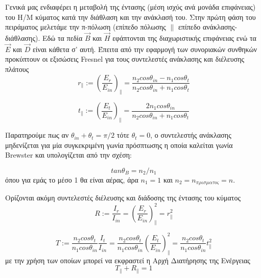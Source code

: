 \documentclass[a4paper]{article}
\begin{document}
Γενικά μας ενδιαφέρει η μεταβολή της έντασης (μέση ισχύς ανά μονάδα επιφάνειας) του Η/Μ κύματος κατά την διάθλαση και την ανάκλασή του. Στην πρώτη φάση του πειράματος μελετάμε την π-πόλωση (επίπεδο πόλωσης $\parallel$ επίπεδο ανάκλασης-διάθλασης). \footnotemark
{}
 Εδώ τα πεδία $\vec{B}$ και $\vec{H}$ εφάπτονται της διαχωριστικής επιφάνειας ενώ τα $\vec{E}$ και $\vec{D}$ είναι κάθετα σ' αυτή. Έπειτα από την εφαρμογή των συνοριακών συνθηκών προκύπτουν οι εξισώσεις Fresnel για τους συντελεστές ανάκλασης και διέλευσης πλάτους
\begin{equation}\label{1}
 r_{\parallel} := \left( \frac{E_r}{E_{in}} \right)_{\parallel} = \frac{n_2cos\theta_{in}-n_1cos			              \theta_t}{n_2cos\theta_{in}+n_1cos\theta_t}     
 \end{equation}
 
 \begin{equation}\label{2}
	t_{\parallel} := \left( \frac{E_t}{E_{in}} \right)_{\parallel} = \frac{2n_1cos\theta_{in}}{n_2cos\theta_{in}+n_1cos\theta_t}
\end{equation}
	
Παρατηρούμε πως αν $\theta_{in} + \theta_{t} = \pi/2$ τότε $\theta_{t} = 0 $, ο συντελεστής ανάκλασης μηδενίζεται για μία συγκεκριμένη γωνία πρόσπτωσης η οποία καλείται γωνία Brewster και υπολογίζεται από την σχέση: 

\begin{equation}\label{3}
 tan\theta_{B} = n_2/n_1 
\end{equation}
	όπου για εμάς το μέσο 1 θα είναι αέρας, άρα $n_1=1$ και $n_2=n_{πρισματος} = n$.
	
	Ορίζονται ακόμη συντελεστές διέλευσης και διάδοσης της έντασης του κύματος 
	\begin{equation}\label{4}
	R := \frac{I_r}{I_{in}} = \left( \frac{E_r}{E_{in}} \right)_{\parallel}^2 = r_{\parallel}^2
	\end{equation}
	 
	 \begin{equation}\label{5}
	 	 T := \frac{n_2 cos\theta_{t}}{n_1cos\theta_{in}} \frac{I_t}{I_{in}} = \frac{n_2 cos\theta_{t}}{n_1cos\theta_{in}}  \left( \frac{E_t}{E_{in}} \right)_{\parallel}^2 = \frac{n_2 cos\theta_{t}}{n_1cos\theta_{in}}  t_{\parallel}^2 
	 \end{equation}
με την χρήση των οποίων μπορεί να εκφραστεί η Αρχή Διατήρησης της Ενέργειας 
	$$T_{\parallel} + R_{\parallel} = 1 $$
\end{document}
